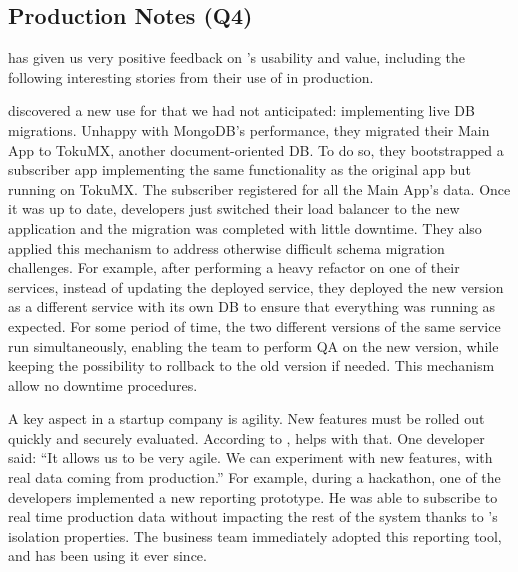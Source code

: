 \subsection{Production Notes (Q4)}
\label{synapse:sec:eval:ease-of-use}

\crowdtap has given us very positive feedback on \synapse's
usability and value, including the following interesting stories from
their use of \synapse in production.

 \crowdtap discovered a new use for
\synapse that we had not anticipated: implementing live DB
migrations.  Unhappy with MongoDB's performance, they migrated their Main App to
TokuMX, another document-oriented DB.  To do so, they bootstrapped a subscriber
app implementing the same functionality as the original app but running on
TokuMX. The subscriber registered for all the Main App's data.  Once it was up
to date, developers just switched their load balancer to the new application and
the migration was completed with little downtime.  They also applied this
mechanism to address otherwise difficult schema migration challenges.
For example, after performing a heavy refactor on one of their services,
instead of updating the deployed service, they deployed the new version
as a different service with its own DB to ensure that everything was
running as expected. For some period of time, the two different versions of the
same service run simultaneously, enabling the team to perform QA on the new
version, while keeping the possibility to rollback to the old version if needed.
This mechanism allow no downtime procedures.

 A key aspect in a startup company is
agility.  New features must be rolled out quickly and securely evaluated.
According to \crowdtap, \synapse helps with that. One developer said: ``It
allows us to be very agile. We can experiment with new features, with real
data coming from production.''  For example, during a hackathon, one of the
developers implemented a new reporting prototype. He was able to subscribe to
real time production data without impacting the rest of the system thanks to
\synapse's isolation properties. The business team immediately adopted this
reporting tool, and has been using it ever since.

